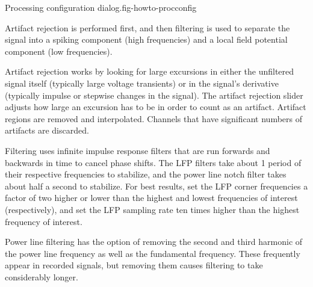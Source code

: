 {Processing configuration dialog.}{fig-howto-procconfig}

Artifact rejection is performed first, and then filtering is used to
separate the signal into a spiking component (high frequencies) and a
local field potential component (low frequencies).

Artifact rejection works by looking for large excursions in either the
unfiltered signal itself (typically large voltage transients) or in the
signal's derivative (typically impulse or stepwise changes in the signal).
The artifact rejection slider adjusts how large an excursion has to be in
order to count as an artifact. Artifact regions are removed and interpolated.
Channels that have significant numbers of artifacts are discarded.

Filtering uses infinite impulse response filters that are run forwards and
backwards in time to cancel phase shifts. The LFP filters take about 1 period
of their respective frequencies to stabilize, and the power line notch filter
takes about half a second to stabilize. For best results, set the LFP corner
frequencies a factor of two higher or lower than the highest and lowest
frequencies of interest (respectively), and set the LFP sampling rate ten
times higher than the highest frequency of interest.

Power line filtering has the option of removing the second and third harmonic
of the power line frequency as well as the fundamental frequency. These
frequently appear in recorded signals, but removing them causes filtering to
take considerably longer.

